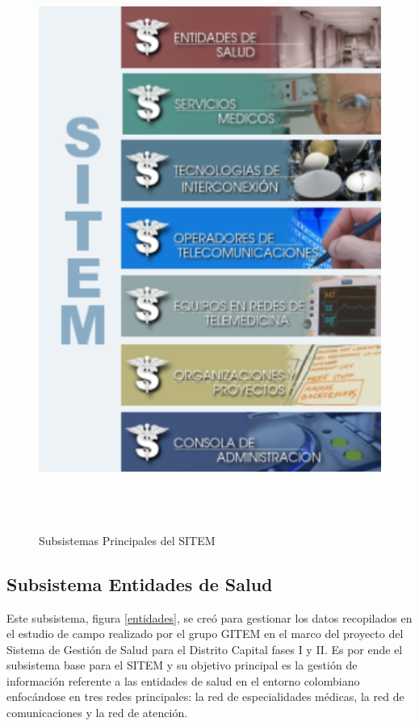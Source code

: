 \begin{figure}
 \centering
 \includegraphics[width=140mm, height=190mm]{componentes_sitem.png}
 \caption{Subsistemas Principales del SITEM}
 \label{componentes_sitem}
\end{figure}


\subsection{Subsistema Entidades de Salud} 
Este subsistema, figura \ref{entidades}, se creó para gestionar los datos recopilados en el estudio de campo realizado por el grupo GITEM en el marco del proyecto del Sistema de Gestión de Salud para el Distrito Capital fases I y II. Es por ende el subsistema base para el SITEM y su objetivo principal es la gestión de información referente a las entidades de salud en el entorno colombiano enfocándose en tres redes principales: la red de especialidades médicas, la red de comunicaciones y la red de atención.

